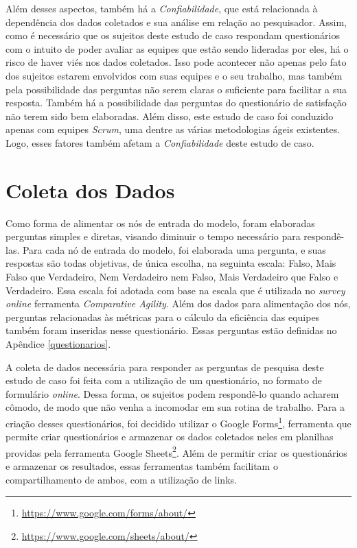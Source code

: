 Além desses aspectos, também há a \textit{Confiabilidade}, que está relacionada à dependência dos dados coletados e sua análise em relação ao pesquisador. Assim, como é necessário que os sujeitos deste estudo de caso respondam questionários com o intuito de poder avaliar as equipes que estão sendo lideradas por eles, há o risco de haver viés nos dados coletados. Isso pode acontecer não apenas pelo fato dos sujeitos estarem envolvidos com suas equipes e o seu trabalho, mas também pela possibilidade das perguntas não serem claras o suficiente para facilitar a sua resposta. Também há a possibilidade das perguntas do questionário de satisfação não terem sido bem elaboradas. Além disso, este estudo de caso foi conduzido apenas com equipes \textit{Scrum}, uma dentre as várias metodologias ágeis existentes. Logo, esses fatores também afetam a \textit{Confiabilidade} deste estudo de caso.

\section{Coleta dos Dados}
\label{estudodecaso:coleta}

Como forma de alimentar os nós de entrada do modelo, foram elaboradas perguntas simples e diretas, visando diminuir o tempo necessário para respondê-las. Para cada nó de entrada do modelo, foi elaborada uma pergunta, e suas respostas são todas objetivas, de única escolha, na seguinta escala: Falso, Mais Falso que Verdadeiro, Nem Verdadeiro nem Falso, Mais Verdadeiro que Falso e Verdadeiro. Essa escala foi adotada com base na escala que é utilizada no \textit{survey online} ferramenta \textit{Comparative Agility}. Além dos dados para alimentação dos nós, perguntas relacionadas às métricas para o cálculo da eficiência das equipes também foram inseridas nesse questionário. Essas perguntas estão definidas no Apêndice \ref{questionarios}.

A coleta de dados necessária para responder as perguntas de pesquisa deste estudo de caso foi feita com a utilização de um questionário, no formato de formulário \textit{online}. Dessa forma, os sujeitos podem respondê-lo quando acharem cômodo, de modo que não venha a incomodar em sua rotina de trabalho. Para a criação desses questionários, foi decidido utilizar o Google Forms\footnote{\url{https://www.google.com/forms/about/}}, ferramenta que permite criar questionários e armazenar os dados coletados neles em planilhas providas pela ferramenta Google Sheets\footnote{\url{https://www.google.com/sheets/about/}}. Além de permitir criar os questionários e armazenar os resultados, essas ferramentas também facilitam o compartilhamento de ambos, com a utilização de links.

